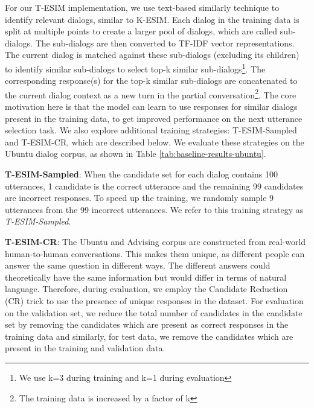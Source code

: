 \documentclass[letterpaper]{article} %
\begin{document}

For our T-ESIM implementation, we use text-based similarly technique to identify relevant dialogs, similar to K-ESIM. Each dialog in the training data is split at multiple points to create a larger pool of dialogs, which are called sub-dialogs. The sub-dialogs are then converted to TF-IDF vector representations. The current dialog is matched against these sub-dialogs (excluding its children) to identify similar sub-dialogs to select top-k similar sub-dialogs\footnote{We use k=3 during training and k=1 during evaluation}. The corresponding response(s) for the top-k similar sub-dialogs are concatenated to the current dialog context as a new turn in the partial conversation\footnote{The training data is increased by a factor of k}. The core motivation here is that the model can learn to use responses for similar dialogs present in the training data, to get improved performance on the next utterance selection task. We also explore additional training strategies: T-ESIM-Sampled and T-ESIM-CR, which are described below. We evaluate these strategies on the Ubuntu dialog corpus, as shown in Table \ref{tab:baseline-results-ubuntu}.

\textbf{T-ESIM-Sampled}: When the candidate set for each dialog contains 100 utterances, 1 candidate is the correct utterance and the remaining 99 candidates are incorrect responses. To speed up the training, we randomly sample 9 utterances from the 99 incorrect utterances. We refer to this training strategy as \textit{T-ESIM-Sampled}.

\textbf{T-ESIM-CR}: The Ubuntu and Advising corpus are constructed from real-world human-to-human conversations. This makes them unique, as different people can answer the same question in different ways. The different answers could theoretically have the same information but would differ in terms of natural language. Therefore, during evaluation, we employ the Candidate Reduction (CR) trick to use the presence of unique responses in the dataset. For evaluation on the validation set, we reduce the total number of candidates in the candidate set by removing the candidates which are present as correct responses in the training data and similarly, for test data, we remove the candidates which are present in the training and validation data.
\end{document}

